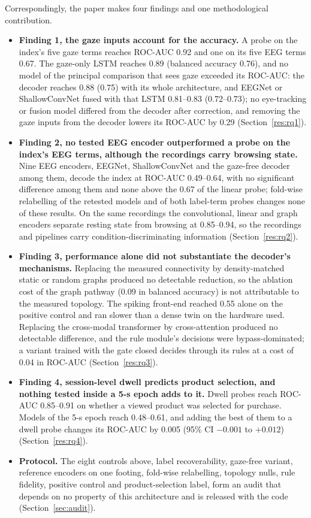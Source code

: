 \documentclass[pdflatex,sn-basic,Numbered,twocolumn,iicol]{sn-jnl}
\theoremstyle{thmstyleone}%
\theoremstyle{thmstyletwo}%
\theoremstyle{thmstylethree}%
\begin{document}
Correspondingly, the paper makes four findings and one methodological contribution.
\begin{itemize}
\item \textbf{Finding 1, the gaze inputs account for the accuracy.} A probe on the index's five gaze terms reaches ROC-AUC 0.92 and one on its five EEG terms 0.67. The gaze-only LSTM reaches 0.89 (balanced accuracy 0.76), and no model of the principal comparison that sees gaze exceeded its ROC-AUC: the decoder reaches 0.88 (0.75) with its whole architecture, and EEGNet or ShallowConvNet fused with that LSTM 0.81--0.83 (0.72--0.73); no eye-tracking or fusion model differed from the decoder after correction, and removing the gaze inputs from the decoder lowers its ROC-AUC by 0.29 (Section~\ref{res:rq1}).
\item \textbf{Finding 2, no tested EEG encoder outperformed a probe on the index's EEG terms, although the recordings carry browsing state.} Nine EEG encoders, EEGNet, ShallowConvNet and the gaze-free decoder among them, decode the index at ROC-AUC 0.49--0.64, with no significant difference among them and none above the 0.67 of the linear probe; fold-wise relabelling of the retested models and of both label-term probes changes none of these results. On the same recordings the convolutional, linear and graph encoders separate resting state from browsing at 0.85--0.94, so the recordings and pipelines carry condition-discriminating information (Section~\ref{res:rq2}).
\item \textbf{Finding 3, performance alone did not substantiate the decoder's mechanisms.} Replacing the measured connectivity by density-matched static or random graphs produced no detectable reduction, so the ablation cost of the graph pathway (0.09 in balanced accuracy) is not attributable to the measured topology. The spiking front-end reached 0.55 alone on the positive control and ran slower than a dense twin on the hardware used. Replacing the cross-modal transformer by cross-attention produced no detectable difference, and the rule module's decisions were bypass-dominated; a variant trained with the gate closed decides through its rules at a cost of 0.04 in ROC-AUC (Section~\ref{res:rq3}).
\item \textbf{Finding 4, session-level dwell predicts product selection, and nothing tested inside a 5-s epoch adds to it.} Dwell probes reach ROC-AUC 0.85--0.91 on whether a viewed product was selected for purchase. Models of the 5-s epoch reach 0.48--0.61, and adding the best of them to a dwell probe changes its ROC-AUC by 0.005 (95\% CI $-0.001$ to $+0.012$) (Section~\ref{res:rq4}).
\item \textbf{Protocol.} The eight controls above, label recoverability, gaze-free variant, reference encoders on one footing, fold-wise relabelling, topology nulls, rule fidelity, positive control and product-selection label, form an audit that depends on no property of this architecture and is released with the code (Section~\ref{sec:audit}).
\end{itemize}
\end{document}

